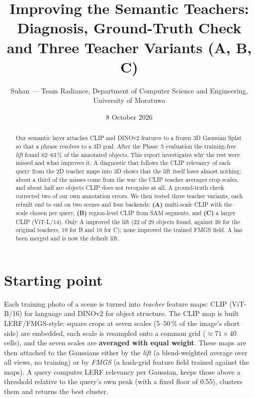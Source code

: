 \documentclass[11pt,a4paper]{article}
\title{Improving the Semantic Teachers:\\[2pt]
\large Diagnosis, Ground-Truth Check and Three Teacher Variants (A, B, C)}
\author{Suhan --- Team Radiance, Department of Computer Science and Engineering,\\University of Moratuwa}
\date{8 October 2026}
\begin{document}
\maketitle

\begin{abstract}
Our semantic layer attaches CLIP and DINOv2 features to a frozen 3D Gaussian Splat so that a phrase resolves to a
3D goal. After the Phase~5 evaluation the training-free \emph{lift} found 62--63\,\% of the annotated objects.
This report investigates why the rest were missed and what improves it. A diagnostic that follows the CLIP
relevancy of each query from the 2D teacher maps into 3D shows that the lift itself loses almost nothing; about
a third of the misses come from the way the CLIP teacher averages crop scales, and about half are objects CLIP
does not recognise at all. A ground-truth check corrected two of our own annotation errors. We then tested three
teacher variants, each rebuilt end to end on two scenes and four backends: \textbf{(A)} multi-scale CLIP with the
scale chosen per query, \textbf{(B)} region-level CLIP from SAM segments, and \textbf{(C)} a larger CLIP
(ViT-L/14). Only A improved the lift (22 of 29 objects found, against 20 for the original teachers, 19 for B and
18 for C); none improved the trained FMGS field. A has been merged and is now the default lift.
\end{abstract}

\tableofcontents

\section{Starting point}

Each training photo of a scene is turned into \emph{teacher} feature maps: CLIP (ViT-B/16) for language and
DINOv2 for object structure. The CLIP map is built LERF/FMGS-style: square crops at seven scales (5--50\,\% of the
image's short side) are embedded, each scale is resampled onto a common grid ($\approx71\times40$ cells), and the
seven scales are \textbf{averaged with equal weight}. These maps are then attached to the Gaussians either by the
\emph{lift} (a blend-weighted average over all views, no training) or by \emph{FMGS} (a hash-grid feature field
trained against the maps). A query computes LERF relevancy per Gaussian, keeps those above a threshold relative to
the query's own peak (with a fixed floor of 0.55), clusters them and returns the best cluster.
\end{document}
